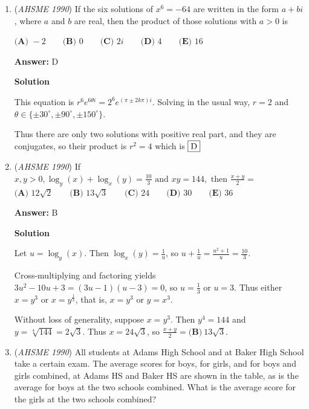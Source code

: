 \begin{enumerate}
 Now turning to the dotted triangle, by Pythagoras, the square of the pyramid's height is 
 \[PQ^2-(\frac12)^2=\frac{\cos^2\theta}{4\sin^2\theta}-\frac14=\frac{\cos^2\theta-\sin^2\theta}{4\sin^2\theta}=\frac{\cos 2\theta}{4\sin^2\theta}\] and after taking the square root and dividing by three, the result is $\fbox{E}$



	\item (\textit{AHSME 1990}) If the six solutions of $x^6=-64$ are written in the form $a+bi$, where $a$ and $b$ are real, then the product of those solutions with $a>0$ is


 $\textbf{(A) } -2\qquad \textbf{(B) } 0\qquad \textbf{(C) } 2i\qquad \textbf{(D) } 4\qquad \textbf{(E) } 16$

 \textbf{Answer: }D



\textbf{Solution}

This equation is $r^6e^{6\theta i}=2^6e^{(\pi\pm 2k\pi) i}$. Solving in the usual way, $r=2$ and $\theta\in\{\pm 30^\circ,\pm 90^\circ,\pm 150^\circ\}$.

 Thus there are only two solutions with positive real part, and they are conjugates, so their product is $r^2=4$ which is $\fbox{D}$



	\item (\textit{AHSME 1990}) If $x,y>0, \log_y(x)+\log_x(y)=\frac{10}{3} \text{ and } xy=144,\text{ then }\frac{x+y}{2}=$
$\textbf{(A) } 12\sqrt{2}\qquad \textbf{(B) } 13\sqrt{3}\qquad \textbf{(C) } 24\qquad \textbf{(D) } 30\qquad \textbf{(E) } 36$

 \textbf{Answer: }B



\textbf{Solution}

Let $u = \log_y(x)$.  Then $\log_x(y) = \frac{1}{u}$, so $u + \frac{1}{u} = \frac{u^2+1}{u} = \frac{10}{3}$.  

 Cross-multiplying and factoring yields $3u^2 - 10u + 3 = (3u-1)(u-3) = 0$, so $u = \frac{1}{3}$ or $u = 3$.  Thus either $x = y^3$ or $x = y^{\frac{1}{3}}$, that is, $x = y^3$ or $y = x^3$.    

 Without loss of generality, suppose $x = y^3$.  Then $y^4 = 144$ and $y = \sqrt[4]{144} = 2\sqrt{3}$.  Thus $x = 24\sqrt{3}$, so $\frac{x + y}{2} = \boxed{\textbf{(B)}\ 13\sqrt{3}}$.

 


	\item (\textit{AHSME 1990}) All students at Adams High School and at Baker High School take a certain exam. The average scores for boys, for girls, and for boys and girls combined, at Adams HS and Baker HS are shown in the table, as is the average for boys at the two schools combined. What is the average score for the girls at the two schools combined?


\end{enumerate}
